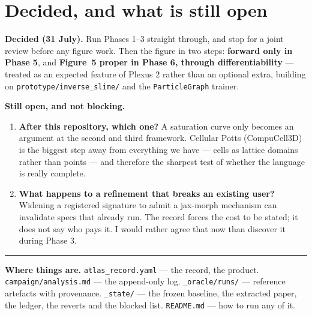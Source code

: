 \documentclass[11pt,a4paper]{article}
\newcommand{\code}[1]{\texttt{#1}}
\begin{document}
\section{Decided, and what is still open}

\textbf{Decided (31 July).} Run Phases 1--3 straight through, and stop for a joint review before
any figure work. Then the figure in two steps: \textbf{forward only in Phase 5}, and
\textbf{Figure~5 proper in Phase 6, through differentiability} --- treated as an expected feature
of Plexus 2 rather than an optional extra, building on \code{prototype/inverse\_slime/} and the
\code{ParticleGraph} trainer.

\textbf{Still open, and not blocking.}

\begin{enumerate}[leftmargin=1.4em]
\item \textbf{After this repository, which one?} A saturation curve only becomes an argument at
the second and third framework. Cellular Potts (CompuCell3D) is the biggest step away from
everything we have --- cells as lattice domains rather than points --- and therefore the sharpest
test of whether the language is really complete.
\item \textbf{What happens to a refinement that breaks an existing user?} Widening a registered
signature to admit a jax-morph mechanism can invalidate specs that already run. The record forces
the cost to be stated; it does not say who pays it. I would rather agree that now than discover it
during Phase 3.
\end{enumerate}

\vspace{6pt}
\hrule
\vspace{6pt}
{\small\color{grey}
\textbf{Where things are.} \code{atlas\_record.yaml} --- the record, the product.
\code{campaign/analysis.md} --- the append-only log. \code{\_oracle/runs/} --- reference artefacts
with provenance. \code{\_state/} --- the frozen baseline, the extracted paper, the ledger, the
reverts and the blocked list. \code{README.md} --- how to run any of it.}
\end{document}
